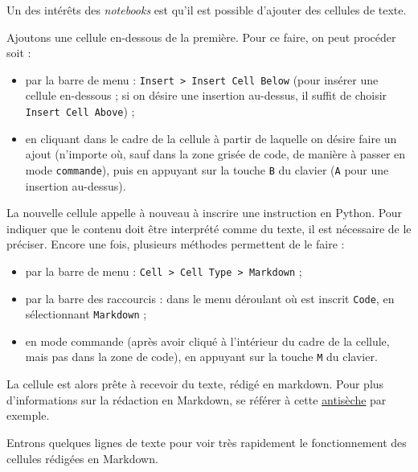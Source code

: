\documentclass[12pt,]{book}
\providecommand{\tightlist}{%
  \setlength{\itemsep}{0pt}\setlength{\parskip}{0pt}}
\numberwithin{equation}{section}
\numberwithin{countremarque}{section}
\begin{document}
Un des intérêts des \emph{notebooks} est qu'il est possible d'ajouter
des cellules de texte.

Ajoutons une cellule en-dessous de la première. Pour ce faire, on peut
procéder soit :

\begin{itemize}
\tightlist
\item
  par la barre de menu :
  \texttt{Insert\ \textgreater{}\ Insert\ Cell\ Below} (pour insérer une
  cellule en-dessous ; si on désire une insertion au-dessus, il suffit
  de choisir \texttt{Insert\ Cell\ Above}) ;
\item
  en cliquant dans le cadre de la cellule à partir de laquelle on désire
  faire un ajout (n'importe où, sauf dans la zone grisée de code, de
  manière à passer en mode \texttt{commande}), puis en appuyant sur la
  touche \texttt{B} du clavier (\texttt{A} pour une insertion
  au-dessus).
\end{itemize}

La nouvelle cellule appelle à nouveau à inscrire une instruction en
Python. Pour indiquer que le contenu doit être interprété comme du
texte, il est nécessaire de le préciser. Encore une fois, plusieurs
méthodes permettent de le faire :

\begin{itemize}
\tightlist
\item
  par la barre de menu :
  \texttt{Cell\ \textgreater{}\ Cell\ Type\ \textgreater{}\ Markdown} ;
\item
  par la barre des raccourcis : dans le menu déroulant où est inscrit
  \texttt{Code}, en sélectionnant \texttt{Markdown} ;
\item
  en mode commande (après avoir cliqué à l'intérieur du cadre de la
  cellule, mais pas dans la zone de code), en appuyant sur la touche
  \texttt{M} du clavier.
\end{itemize}

La cellule est alors prête à recevoir du texte, rédigé en markdown. Pour
plus d'informations sur la rédaction en Markdown, se référer à cette
\href{https://github.com/adam-p/markdown-here/wiki/Markdown-Cheatsheet}{antisèche}
par exemple.

Entrons quelques lignes de texte pour voir très rapidement le
fonctionnement des cellules rédigées en Markdown.
\end{document}
